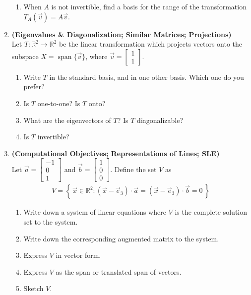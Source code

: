 \documentclass[red]{tutorial}
\newcommand{\R}{\mathbb{R}}
\newcommand{\smat}[1]{\left[\begin{smallmatrix} #1 %
\end{smallmatrix}\right]}
\DeclareMathOperator{\Span} {span}
\theoremstyle{definition}
\theoremstyle{theorem}
\begin{document}
\begin{tutorial}
\begin{enumerate}
\begin{enumerate}
        \item When $A$ is not invertible, find a basis for the range of the
          transformation $T_A(\vec v) = A\vec v$.
      \end{enumerate}
    \item \textbf{(Eigenvalues \& Diagonalization; Similar Matrices;
      Projections)}\\
      Let $T\colon\R^2\to\R^2$ be the linear transformation which
      projects vectors onto the subspace $X=\Span\{\vec v\}$,
      where $\vec v = \smat{1\\1}$.
      \begin{enumerate}
        \item \label{q:standard_basis}
          Write $T$ in the standard basis, and in one other 
          basis. Which one do you prefer?
        \item Is $T$ one-to-one? Is $T$ onto?
        \item What are the eigenvectors of $T$? Is $T$ diagonalizable?
        \item Is $T$ invertible?
      \end{enumerate}
    \item \textbf{(Computational Objectives; Representations of Lines;
      SLE)}\\
      Let $\vec a = \smat{-1\\0\\1}$ and $\vec b = \smat{1\\0\\0}$.
      Define the set $V$ as
      \begin{align*}
        V = \left\{\,\vec x\in \R^2 :
        (\vec x - \vec e_3)\cdot \vec a = %
        (\vec x - \vec e_3)\cdot \vec b =0 \,\right\}
      \end{align*}
      \begin{enumerate}
        \item Write down a system of linear equations where
              $V$ is the complete solution set to the system.
        \item Write down the corresponding augmented matrix 
          to the system.
        \item Express $V$ in vector form.
        \item Express $V$ as the span or translated span of
              vectors.
        \item Sketch $V$.
      \end{enumerate}
  \end{enumerate}
\end{tutorial}
\end{document}
